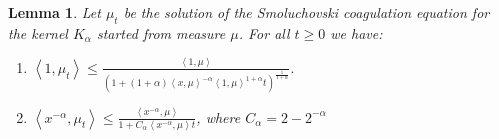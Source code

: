 \documentclass[11pt,a4paper]{article}
\newtheorem{lemma}[theorem]{Lemma}
\begin{document}
\begin{lemma}\label{lem:bound_smol_1}
    Let $\mu_t$ be the solution of the Smoluchovski coagulation equation for the kernel $K_\alpha$ started from measure $\mu$. For all $t\geq 0$ we have:
    \begin{enumerate}[label=(\roman*)]
        \item \( \left\langle 1, \mu_t \right\rangle \leq \frac{\left\langle 1, \mu \right\rangle}{\left(1 + (1 + \alpha)\left\langle x, \mu \right\rangle^{-\alpha} \left\langle 1, \mu \right\rangle^{1 + \alpha} t \right)^{\frac{1}{1 + \alpha}}}.\)
        \item \(\left\langle x^{-\alpha}, \mu_t \right\rangle \leq \frac{\left\langle x^{-\alpha}, \mu \right\rangle}{1 + C_\alpha\left\langle x^{-\alpha}, \mu \right\rangle t }\), where $C_\alpha = 2 - 2^{-\alpha}$
    \end{enumerate}
\end{lemma}
\end{document}
